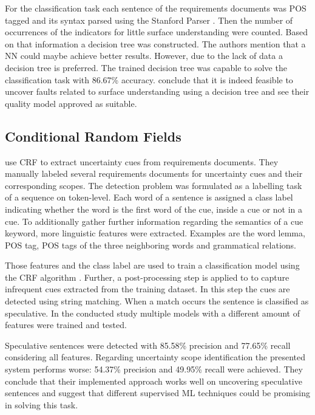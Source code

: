 For the classification task each sentence of the requirements documents was \ac{POS} tagged and its syntax parsed using the Stanford Parser \parencite{Klein:2002}.
Then the number of occurrences of the indicators for little surface understanding were counted.
Based on that information a decision tree was constructed.
The authors mention that a \ac{NN} could maybe achieve better results.
However, due to the lack of data a decision tree is preferred.
The trained decision tree was capable to solve the classification task with 86.67\% accuracy.
\textcite{Ormandjieva:2007} conclude that it is indeed feasible to uncover faults related to surface understanding using a decision tree and see their quality model approved as suitable.

\subsection{Conditional Random Fields}
\textcite{Yang:2012} use \ac{CRF} to extract uncertainty cues from requirements documents.
They manually labeled several requirements documents for uncertainty cues and their corresponding scopes.
The detection problem was formulated as a labelling task of a sequence on token-level.
Each word of a sentence is assigned a class label indicating whether the word is the first word of the cue, inside a cue or not in a cue.
To additionally gather further information regarding the semantics of a cue keyword, more linguistic features were extracted.
Examples are the word lemma, \ac{POS} tag, \ac{POS} tags of the three neighboring words and grammatical relations.

Those features and the class label are used to train a classification model using the \ac{CRF} algorithm \parencite{Lafferty:2001}.
Further, a post-processing step is applied to to capture infrequent cues extracted from the training dataset.
In this step the cues are detected using string matching.
When a match occurs the sentence is classified as speculative.
In the conducted study multiple models with a different amount of features were trained and tested.

Speculative sentences were detected with 85.58\% precision and 77.65\% recall considering all features.
Regarding uncertainty scope identification the presented system performs worse: 54.37\% precision and 49.95\% recall were achieved.
They conclude that their implemented approach works well on uncovering speculative sentences and suggest that different supervised \ac{ML} techniques could be promising in solving this task.

